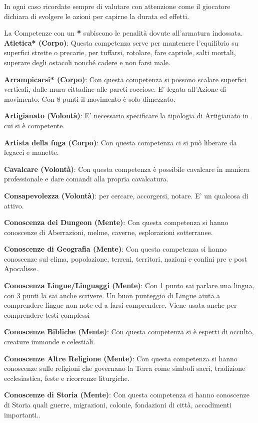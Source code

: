 \documentclass[12pt,a4paper,twoside,openany]{book}
\begin{document}
\begin{multicols}{2}
In ogni caso ricordate sempre di valutare con attenzione come il giocatore dichiara di svolgere le azioni per capirne la durata ed effetti. 

La Competenze con un \textbf{*} subiscono le penalità dovute all'armatura indossata.\\

\textbf{Atletica* (Corpo)}: Questa competenza serve per mantenere l'equilibrio su superfici strette o precarie, per tuffarsi, rotolare, fare capriole, salti mortali, superare degli ostacoli nonché cadere e non farsi male. 

\textbf{Arrampicarsi* (Corpo)}: Con questa competenza si possono scalare superfici verticali, dalle mura cittadine alle pareti rocciose. E' legata all'Azione di movimento. Con 8 punti il movimento è solo dimezzato.

\textbf{Artigianato (Volontà)}: E' necessario specificare la tipologia di Artigianato in cui si è competente.

\textbf{Artista della fuga (Corpo)}: Con questa competenza ci si può liberare da legacci e manette.

\textbf{Cavalcare (Volontà)}: Con questa competenza è possibile cavalcare in maniera professionale e dare comandi alla propria cavalcatura. 

\textbf{Consapevolezza (Volontà)}: per cercare, accorgersi, notare. E' un qualcosa di attivo.

\textbf{Conoscenza dei Dungeon (Mente)}: Con questa competenza si hanno conoscenze di Aberrazioni, melme, caverne, esplorazioni sotterranee.

\textbf{Conoscenze di Geografia (Mente)}: Con questa competenza si hanno conoscenze sul clima, popolazione, terreni, territori, nazioni e confini pre e post Apocalisse.

\textbf{Conoscenza Lingue/Linguaggi (Mente)}: Con 1 punto sai parlare una lingua, con 3 punti la sai anche scrivere. Un buon punteggio di Lingue aiuta a comprendere lingue non note ed a farsi comprendere. Viene usata anche per comprendere testi complessi

\textbf{Conoscenze Bibliche (Mente)}: Con questa competenza si è esperti di occulto, creature immonde e celestiali. 

\textbf{Conoscenze Altre Religione (Mente)}: Con questa competenza si hanno conoscenze sulle religioni che governano la Terra come simboli sacri, tradizione ecclesiastica, feste e ricorrenze liturgiche. 

\textbf{Conoscenze di Storia (Mente)}: Con questa competenza si hanno conoscenze di Storia quali guerre, migrazioni, colonie, fondazioni di città, accadimenti importanti..


\end{multicols}
\end{document}
